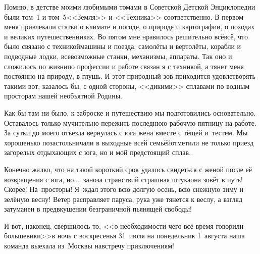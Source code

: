 Помню, в детстве моими любимыми томами в Советской Детской Энциклопедии были том~1 и том~5\mdash <<Земля>> и <<Техника>> соответственно. В первом меня привлекали статьи о климате и погоде, о природе и картографии, о походах и великих путешественниках. Во пятом мне нравилось решительно всё\mdash всё, что было связано с техникой\mdash машины и поезда, самолёты и вертолёты, корабли и подводные лодки, всевозможные станки, механизмы, аппараты. Так оно и сложилось по жизни\mdash по профессии и работе связан я с техникой, а тянет меня постоянно на природу, в глушь. И этот природный зов приходится удовлетворять такими вот, казалось бы, с одной стороны, <<дикими>> сплавами по водным просторам нашей необъятной Родины.

Как бы там ни было, к заброске и путешествию мы подготовились основательно. Оставалось только мучительно пережить последнюю рабочую пятницу на работе. За сутки до моего отъезда вернулась с юга жена вместе с тёщей и~тестем. Мы хорошенько позастольничали в выходные всей семьёй\mdash отметили не только приезд загорелых отдыхающих с юга, но и мой предстоящий сплав. 

Конечно жалко, что на такой короткий срок удалось свидеться с женой после её возвращения с юга, но$\ldots$~заноза странствий страшная штука\mdash она зовёт в путь! Скорее! На~просторы! Я~ждал этого всю долгую осень, всю снежную зиму и зелёную весну! Ветер расправляет паруса, рука уже тянется к веслу, а взгляд затуманен в предвкушении безграничной пьянящей свободы!

И вот, наконец, свершилось то, <<о необходимости чего всё время говорили большевики>>\mdash  в ночь с воскресенья 31~июля на понедельник 1~августа наша команда выехала из~Москвы навстречу приключениям!

\begin{center}
\end{center}
